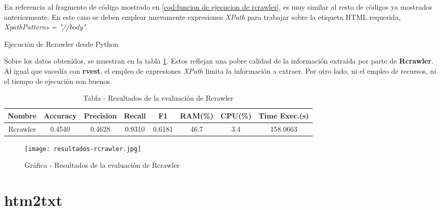En referencia al fragmento de código mostrado en \ref{cod:funcion de ejecucion de rcrawler}, es muy similar
al resto de códigos ya mostrados anteriormente. En este caso se deben emplear nuevamente expresiones
\emph{XPath} para trabajar sobre la etiqueta HTML requerida, \emph{XpathPatterns = "//body"}.

\begin{codefloat}
    
    \caption{Ejecución de Rcrawler desde Python}
    \label{cod:ejecucion de rcrawler desde python}
\end{codefloat}

Sobre los datos obtenidos, se muestran en la tabla \ref{tab:tabla - resultados de la evaluacion de rcrawler}.
Estos reflejan una pobre calidad de la información extraída por parte de \textbf{Rcrawler}. Al igual que
sucedía con \textbf{rvest}, el empleo de expresiones \emph{XPath} limita la información a extraer. Por otro 
lado, ni el empleo de recursos, ni el tiempo de ejecución son buenos.

\begin{table}[h]
    \begin{center}
      \begin{tabular}{| c | c | c | c | c | c | c | c |} \hline 
       \textbf{Nombre} & \textbf{Accuracy} & \textbf{Precision}  & \textbf{Recall} & \textbf{F1} & \textbf{RAM(\%)} & \textbf{CPU(\%)} & \textbf{Time Exec.(s)} \\ \hline
       Rcrawler & 0.4540 & 0.4628 & 0.9310 & 0.6181 & 46.7 & 3.4 & 158.0663 \\ \hline
      \end{tabular}
      \caption{Tabla - Resultados de la evaluación de Rcrawler}
      \label{tab:tabla - resultados de la evaluacion de rcrawler}
    \end{center}
\end{table}

\begin{figure}[tphb]
    \centering
    \texttt{[image: resultados-rcrawler.jpg]}
    \caption{Gráfica - Resultados de la evaluación de Rcrawler}
    \label{img:grafica - resultados de la evaluacion de rcrawler}
\end{figure}

\section*{htm2txt}


